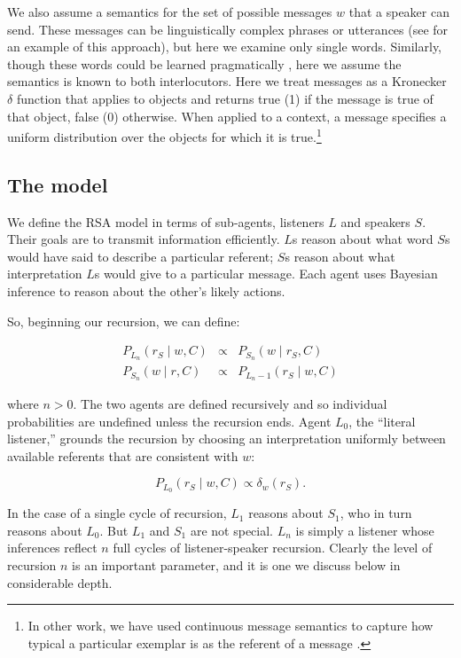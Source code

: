 \documentclass[man]{apa6}
\begin{document}
We also assume a semantics for the set of possible messages $w$ that a speaker can send. These messages can be linguistically complex phrases or utterances (see  for an example of this approach), but here we examine only single words. Similarly, though these words could be learned pragmatically \cite{frank2014,smith2013}, here we assume the semantics is known to both interlocutors. Here we treat messages as a Kronecker $\delta$ function that applies to objects and returns {\sc true} (1) if the message is true of that object, {\sc false} (0) otherwise. When applied to a context, a message specifies a uniform distribution over the objects for which it is true.\footnote{In other work, we have used continuous message semantics to capture how typical a particular exemplar is as the referent of a message \cite{graf2016}.}

\subsection{The model}

We define the RSA model in terms of sub-agents, listeners $L$ and speakers $S$. Their goals are to transmit information efficiently. $L$s reason about what word $S$s would have said to describe a particular referent; $S$s reason about what interpretation $L$s would give to a particular message. Each agent uses Bayesian inference to reason about the other's likely actions.

So, beginning our recursion, we can define:

\begin{eqnarray}
    \label{eq:agents}
    P_{L_n}(r_S \mid w, C) & \propto  & P_{S_n} (w \mid r_S, C)\\
    P_{S_n}(w \mid r, C) & \propto & P_{L_n-1} (r_S \mid w, C)
\end{eqnarray}

\noindent where $n > 0$. The two agents are defined recursively and so individual probabilities are undefined unless the recursion ends. Agent $L_0$, the ``literal listener,'' grounds the recursion by choosing an interpretation uniformly between available referents that are consistent with $w$:

\begin{equation}
P_{L_0}(r_S \mid w, C) \propto \delta_w(r_S).
\end{equation}

In the case of a single cycle of recursion, $L_1$ reasons about $S_1$, who in turn reasons about $L_0$. But $L_1$ and $S_1$ are not special. $L_n$ is simply a listener whose inferences reflect $n$ full cycles of listener-speaker recursion. Clearly the level of recursion $n$ is an important parameter, and it is one we discuss below in considerable depth.
\end{document}
